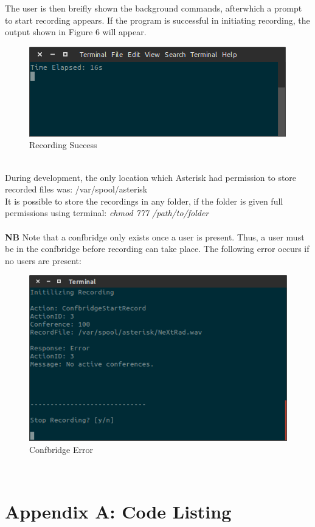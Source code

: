 \documentclass[a4paper,11pt]{report}
\begin{document}
The user is then breifly shown the background commands, afterwhich a prompt to start recording appears. If the program is successful in initiating recording, the output shown in Figure 6 will appear. 
\begin{figure}[h]
  \begin{center}
    \includegraphics[scale = 0.5]{stop}
    \caption{Recording Success}
  \end{center}
\end{figure}\\
During development, the only location which Asterisk had permission to store recorded files was: /var/spool/asterisk \\
It is possible to store the recordings in any folder, if the folder is given full permissions using terminal: \textit{chmod 777 /path/to/folder}\\\\
\textbf{NB} Note that a confbridge only exists once a user is present. Thus, a user must be in the confbridge before recording can take place. The following error occurs if no users are present:
\begin{figure}[h]
  \begin{center}
    \includegraphics[scale = 0.5]{confbridge_error}
    \caption{Confbridge Error}
  \end{center}
\end{figure}\\

\newpage
\section*{Appendix A: Code Listing}

\lstset{escapechar=@,style=customc}

\end{document}
